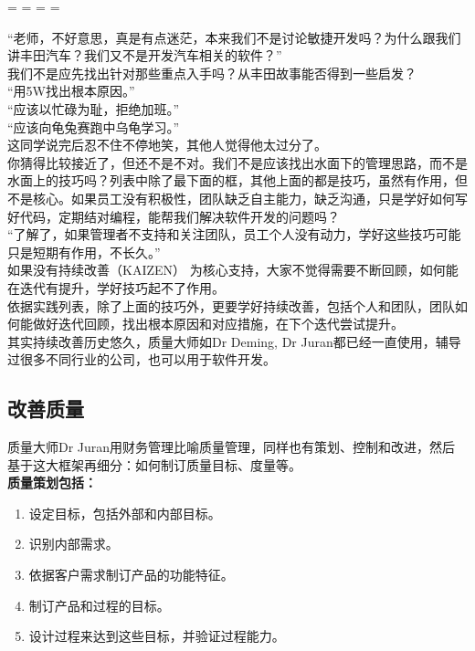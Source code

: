 \begin{description}
\tightlist
\item[]
= = = =
\end{description}

``老师，不好意思，真是有点迷茫，本来我们不是讨论敏捷开发吗？为什么跟我们讲丰田汽车？我们又不是开发汽车相关的软件？''\\
我们不是应先找出针对那些重点入手吗？从丰田故事能否得到一些启发？\\
``用5W找出根本原因。''\\
``应该以忙碌为耻，拒绝加班。''\\
``应该向龟兔赛跑中乌龟学习。''\\
这同学说完后忍不住不停地笑，其他人觉得他太过分了。\\
你猜得比较接近了，但还不是不对。我们不是应该找出水面下的管理思路，而不是水面上的技巧吗？列表中除了最下面的框，其他上面的都是技巧，虽然有作用，但不是核心。如果员工没有积极性，团队缺乏自主能力，缺乏沟通，只是学好如何写好代码，定期结对编程，能帮我们解决软件开发的问题吗？\\
``了解了，如果管理者不支持和关注团队，员工个人没有动力，学好这些技巧可能只是短期有作用，不长久。''\\
如果没有持续改善（KAIZEN）
为核心支持，大家不觉得需要不断回顾，如何能在迭代有提升，学好技巧起不了作用。\\
依据实践列表，除了上面的技巧外，更要学好持续改善，包括个人和团队，团队如何能做好迭代回顾，找出根本原因和对应措施，在下个迭代尝试提升。\\
其实持续改善历史悠久，质量大师如Dr Deming, Dr
Juran都已经一直使用，辅导过很多不同行业的公司，也可以用于软件开发。

\hypertarget{ux6539ux5584ux8d28ux91cf}{%
\subsection{改善质量}\label{ux6539ux5584ux8d28ux91cf}}

质量大师Dr
Juran用财务管理比喻质量管理，同样也有策划、控制和改进，然后基于这大框架再细分：如何制订质量目标、度量等。\\
\textbf{质量策划包括：}

\begin{enumerate}
\tightlist
\item
  设定目标，包括外部和内部目标。
\item
  识别内部需求。
\item
  依据客户需求制订产品的功能特征。
\item
  制订产品和过程的目标。
\item
  设计过程来达到这些目标，并验证过程能力。\\
\end{enumerate}


